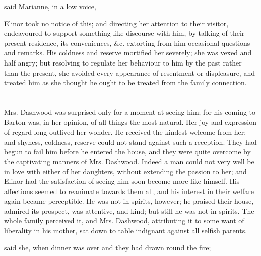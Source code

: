  said Marianne, in a low voice, 

Elinor took no notice of this; and directing her attention to their visitor, endeavoured to support something like discourse with him, by talking of their present residence, its conveniences, &c. extorting from him occasional questions and remarks. His coldness and reserve mortified her severely; she was vexed and half angry; but resolving to regulate her behaviour to him by the past rather than the present, she avoided every appearance of resentment or displeasure, and treated him as she thought he ought to be treated from the family connection.

\chapter{} %

Mrs. Dashwood was surprised only for a moment at seeing him; for his coming to Barton was, in her opinion, of all things the most natural. Her joy and expression of regard long outlived her wonder. He received the kindest welcome from her; and shyness, coldness, reserve could not stand against such a reception. They had begun to fail him before he entered the house, and they were quite overcome by the captivating manners of Mrs. Dashwood. Indeed a man could not very well be in love with either of her daughters, without extending the passion to her; and Elinor had the satisfaction of seeing him soon become more like himself. His affections seemed to reanimate towards them all, and his interest in their welfare again became perceptible. He was not in spirits, however; he praised their house, admired its prospect, was attentive, and kind; but still he was not in spirits. The whole family perceived it, and Mrs. Dashwood, attributing it to some want of liberality in his mother, sat down to table indignant against all selfish parents.

 said she, when dinner was over and they had drawn round the fire; 



